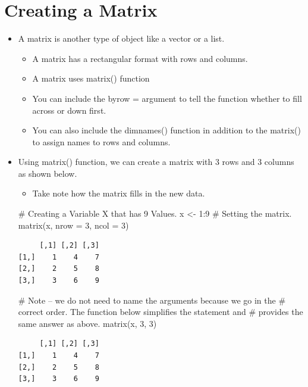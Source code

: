\documentclass[
  letterpaper,
  DIV=11,
  numbers=noendperiod]{scrreprt}
\newenvironment{Shaded}{\begin{snugshade}}{\end{snugshade}}
\newcommand{\AttributeTok}[1]{\textcolor[rgb]{0.40,0.45,0.13}{#1}}
\newcommand{\CommentTok}[1]{\textcolor[rgb]{0.37,0.37,0.37}{#1}}
\newcommand{\DecValTok}[1]{\textcolor[rgb]{0.68,0.00,0.00}{#1}}
\newcommand{\FunctionTok}[1]{\textcolor[rgb]{0.28,0.35,0.67}{#1}}
\newcommand{\NormalTok}[1]{\textcolor[rgb]{0.00,0.23,0.31}{#1}}
\newcommand{\OtherTok}[1]{\textcolor[rgb]{0.00,0.23,0.31}{#1}}
\newcommand{\SpecialCharTok}[1]{\textcolor[rgb]{0.37,0.37,0.37}{#1}}
\providecommand{\tightlist}{%
  \setlength{\itemsep}{0pt}\setlength{\parskip}{0pt}}\usepackage{longtable,booktabs,array}
\begin{document}
\section{Creating a Matrix}\label{creating-a-matrix}

\begin{itemize}
\item
  A matrix is another type of object like a vector or a list.

  \begin{itemize}
  \tightlist
  \item
    A matrix has a rectangular format with rows and columns.
  \item
    A matrix uses matrix() function
  \item
    You can include the byrow = argument to tell the function whether to
    fill across or down first.
  \item
    You can also include the dimnames() function in addition to the
    matrix() to assign names to rows and columns.
  \end{itemize}
\item
  Using matrix() function, we can create a matrix with 3 rows and 3
  columns as shown below.

  \begin{itemize}
  \tightlist
  \item
    Take note how the matrix fills in the new data.
  \end{itemize}

\begin{Shaded}
\begin{Highlighting}[]
\CommentTok{\# Creating a Variable X that has 9 Values.}
\NormalTok{x }\OtherTok{\textless{}{-}} \DecValTok{1}\SpecialCharTok{:}\DecValTok{9}
\CommentTok{\# Setting the matrix.}
\FunctionTok{matrix}\NormalTok{(x, }\AttributeTok{nrow =} \DecValTok{3}\NormalTok{, }\AttributeTok{ncol =} \DecValTok{3}\NormalTok{)}
\end{Highlighting}
\end{Shaded}

\begin{verbatim}
     [,1] [,2] [,3]
[1,]    1    4    7
[2,]    2    5    8
[3,]    3    6    9
\end{verbatim}

\begin{Shaded}
\begin{Highlighting}[]
\CommentTok{\# Note – we do not need to name the arguments because we go in the}
\CommentTok{\# correct order.  The function below simplifies the statement and}
\CommentTok{\# provides the same answer as above.}
\FunctionTok{matrix}\NormalTok{(x, }\DecValTok{3}\NormalTok{, }\DecValTok{3}\NormalTok{)}
\end{Highlighting}
\end{Shaded}

\begin{verbatim}
     [,1] [,2] [,3]
[1,]    1    4    7
[2,]    2    5    8
[3,]    3    6    9
\end{verbatim}
\end{itemize}
\end{document}
